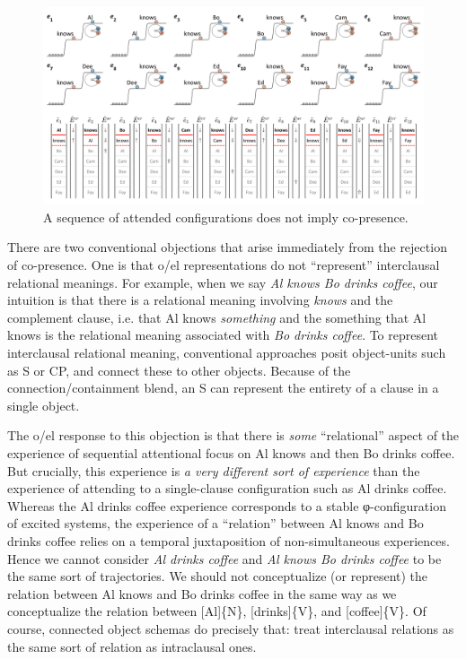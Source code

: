   
\begin{figure}
\includegraphics[width=\textwidth]{figures/Tilsen-img106.png}
\caption{A sequence of attended configurations does not imply co-presence.}
\label{fig:5:2}
\end{figure}
 

  There are two conventional objections that arise immediately from the rejection of co-presence. One is that o/el representations do not “represent” interclausal relational meanings. For example, when we say \textit{Al knows Bo drinks coffee}, our intuition is that there is a relational meaning involving \textit{knows} and the complement clause, i.e. that Al knows \textit{something} and the something that Al knows is the relational meaning associated with \textit{Bo drinks coffee}. To represent interclausal relational meaning, conventional approaches posit object-units such as S or CP, and connect these to other objects. Because of the connection/containment blend, an S can represent the entirety of a clause in a single object. 

  The o/el response to this objection is that there is \textit{some} “relational” aspect of the experience of sequential attentional focus on {\textbar}Al knows{\textbar} and then {\textbar}Bo drinks coffee{\textbar}. But crucially, this experience is \textit{a very different sort of experience} than the experience of attending to a single-clause configuration such as {\textbar}Al drinks coffee{\textbar}. Whereas the {\textbar}Al drinks coffee{\textbar} experience corresponds to a stable φ-configuration of excited systems, the experience of a “relation” between {\textbar}Al knows{\textbar} and {\textbar}Bo drinks coffee{\textbar} relies on a temporal juxtaposition of non-simultaneous experiences. Hence we cannot consider \textit{Al drinks coffee} and \textit{Al knows Bo drinks coffee} to be the same sort of trajectories. We should not conceptualize (or represent) the relation between {\textbar}Al knows{\textbar} and {\textbar}Bo drinks coffee{\textbar} in the same way as we conceptualize the relation between [Al]\{N\}, [drinks]\{V\}, and [coffee]\{V\}. Of course, connected object schemas do precisely that: treat interclausal relations as the same sort of relation as intraclausal ones.

